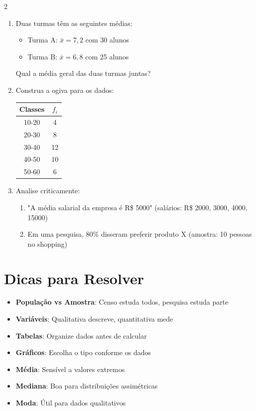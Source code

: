 \documentclass[11pt]{article}
\begin{document}
\begin{multicols}{2}
\begin{enumerate}[leftmargin=*, start=11]

\item Duas turmas têm as seguintes médias:
\begin{itemize}
\item Turma A: $\bar{x} = 7,2$ com 30 alunos
\item Turma B: $\bar{x} = 6,8$ com 25 alunos
\end{itemize}
Qual a média geral das duas turmas juntas?

\item Construa a ogiva para os dados:
\begin{center}
\begin{tabular}{|c|c|}
\hline
\textbf{Classes} & \textbf{$f_i$} \\
\hline
10-20 & 4 \\
20-30 & 8 \\
30-40 & 12 \\
40-50 & 10 \\
50-60 & 6 \\
\hline
\end{tabular}
\end{center}

\item Analise criticamente:
\begin{enumerate}[label=\alph*)]
\item "A média salarial da empresa é R\$ 5000"
  (salários: R\$ 2000, 3000, 4000, 15000)
\item Em uma pesquisa, 80\% disseram preferir produto X
  (amostra: 10 pessoas no shopping)
\end{enumerate}

\end{enumerate}

\section*{Dicas para Resolver}

\begin{itemize}
\item \textbf{População vs Amostra}: Censo estuda todos, pesquisa estuda parte
\item \textbf{Variáveis}: Qualitativa descreve, quantitativa mede
\item \textbf{Tabelas}: Organize dados antes de calcular
\item \textbf{Gráficos}: Escolha o tipo conforme os dados
\item \textbf{Média}: Sensível a valores extremos
\item \textbf{Mediana}: Boa para distribuições assimétricas
\item \textbf{Moda}: Útil para dados qualitativos
\end{itemize}


\end{multicols}
\end{document}
